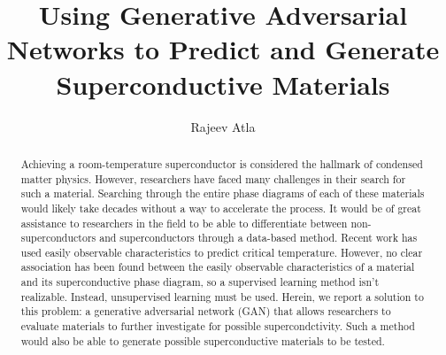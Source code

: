\documentclass{article}
\title{Using Generative Adversarial Networks to Predict and Generate Superconductive Materials}
\author{Rajeev Atla}
\date{}
\begin{document}
\maketitle

\begin{abstract}
Achieving a room-temperature superconductor is considered the hallmark of condensed matter physics.
However, researchers have faced many challenges in their search for such a material.
Searching through the entire phase diagrams of each of these materials would likely take decades without a way to accelerate the process.
It would be of great assistance to researchers in the field to be able to differentiate between non-superconductors and superconductors through a data-based method.
Recent work has used easily observable characteristics to predict critical temperature.
However, no clear association has been found between the easily observable characteristics of a material and its superconductive phase diagram, so a supervised learning method isn't realizable.
Instead, unsupervised learning must be used.
Herein, we report a solution to this problem: a generative adversarial network (GAN) that allows researchers to evaluate materials to further investigate for possible supercondctivity.
Such a method would also be able to generate possible superconductive materials to be tested. 
\end{abstract}
\end{document}
